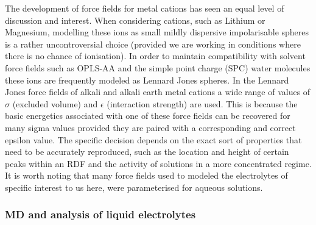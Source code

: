 \documentclass[../main.tex]{subfiles}
\begin{document}
The development of force fields for metal cations has seen an equal level of discussion and interest. When considering cations, such as Lithium or Magnesium\cite{mamatkulov_force_2013,mamatkulov_force_2018}, modelling these ions as small mildly dispersive impolarisable spheres is a rather uncontroversial choice (provided we are working in conditions where there is no chance of ionisation)\cite{schroder_polarizable_2020}. In order to maintain compatibility with solvent force fields such as OPLS-AA and the simple point charge (SPC) water molecules these ions are frequently modeled as Lennard Jones spheres. In the Lennard Jones force fields of alkali and alkali earth metal cations a wide range of values of $\sigma$ (excluded volume) and $\epsilon$ (interaction strength) are used. This is because the basic energetics associated with one of these force fields can be recovered for many sigma values provided they are paired with a corresponding and correct epsilon value. The specific decision depends on the exact sort of properties that need to be accurately reproduced, such as the location and height of certain peaks within an RDF and the activity of solutions in a more concentrated regime\cite{mamatkulov_force_2013}. It is worth noting that many force fields used to modeled the electrolytes of specific interest to us here, were parameterised for aqueous solutions.

\subsubsection{MD and analysis of liquid electrolytes}
\end{document}
